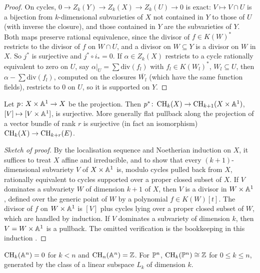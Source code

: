 \begin{proof}
On cycles, $0 \to Z_k(Y) \to Z_k(X) \to Z_k(U) \to 0$ is exact: $V \mapsto V \cap U$ is a bijection from $k$-dimensional subvarieties of $X$ not contained in $Y$ to those of $U$ (with
inverse the closure), and those contained in $Y$ are the subvarieties of $Y$. Both maps preserve rational equivalence, since the divisor of $f \in K(W)^*$ restricts to the divisor of
$f$ on $W \cap U$, and a divisor on $W \subseteq Y$ is a divisor on $W$ in $X$. So $j^*$ is surjective and $j^* \circ i_* = 0$. If $\alpha \in Z_k(X)$ restricts to a cycle rationally
equivalent to zero on $U$, say $\alpha|_U = \sum\mathrm{div}(f_l)$ with $f_l \in K(W_l)^*$, $W_l \subseteq U$, then $\alpha - \sum\mathrm{div}(f_l)$, computed on the closures
$\overline{W_l}$ (which have the same function fields), restricts to $0$ on $U$, so it is supported on $Y$.
\end{proof}

\begin{proposition}\label{intersection-theory:proposition-homotopy}
Let $p \colon X \times \mathbb{A}^1 \to X$ be the projection. Then $p^* \colon \operatorname{CH}_k(X) \to \operatorname{CH}_{k+1}(X \times \mathbb{A}^1)$, $[V] \mapsto [V \times \mathbb{A}^1]$, is surjective. More generally flat
pullback along the projection of a vector bundle of rank $r$ is surjective (in fact an isomorphism) $\operatorname{CH}_k(X) \to \operatorname{CH}_{k+r}(E)$.
\end{proposition}

\begin{proof}[Sketch of proof]
By the localisation sequence and Noetherian induction on $X$, it suffices to treat $X$ affine and irreducible, and to show that every $(k+1)$-dimensional subvariety $V$ of
$X \times \mathbb{A}^1$ is, modulo cycles pulled back from $X$, rationally equivalent to cycles supported over a proper closed subset of $X$. If $V$ dominates a subvariety $W$ of dimension $k + 1$
of $X$, then $V$ is a divisor in $W \times \mathbb{A}^1$, defined over the generic point of $W$ by a polynomial $f \in K(W)[t]$. The divisor of $f$ on $W \times \mathbb{A}^1$ is $[V]$ plus cycles lying over
a proper closed subset of $W$, which are handled by induction. If $V$ dominates a subvariety of dimension $k$, then $V = W \times \mathbb{A}^1$ is a pullback. The omitted verification is the
bookkeeping in this induction \cite[Proposition 1.9 and Theorem 3.3]{fulton-intersection}.
\end{proof}

\begin{theorem}\label{intersection-theory:theorem-chow-projective-space}
$\operatorname{CH}_k(\mathbb{A}^n) = 0$ for $k < n$ and $\operatorname{CH}_n(\mathbb{A}^n) = \mathbb{Z}$. For $\mathbb{P}^n$, $\operatorname{CH}_k(\mathbb{P}^n) \cong \mathbb{Z}$ for $0 \leq k \leq n$, generated by the class of a linear subspace $L_k$ of dimension $k$.
\end{theorem}

